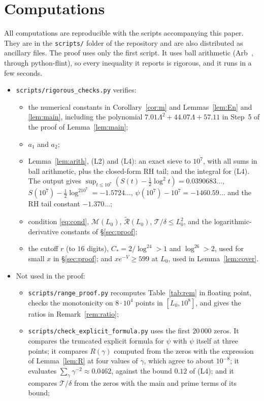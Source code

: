 \documentclass[11pt]{amsart}
\theoremstyle{remark}
\begin{document}
\appendix
\section{Computations}\label{app:comp}
All computations are reproducible with the scripts accompanying this paper. They are in the \texttt{scripts/} folder of the repository and are also distributed as ancillary files. The proof uses only the first script. It uses ball arithmetic (Arb~\cite{Arb}, through python-flint), so every inequality it reports is rigorous, and it runs in a few seconds.
\begin{itemize}
\item \texttt{scripts/rigorous\_checks.py} verifies:
\begin{itemize}
\item[--] the numerical constants in Corollary~\ref{cor:m} and Lemmas~\ref{lem:En} and \ref{lem:main}, including the polynomial $7.01\Lambda^2+44.07\Lambda+57.11$ in Step~5 of the proof of Lemma~\ref{lem:main};
\item[--] $a_1$ and $a_2$;
\item[--] Lemma~\ref{lem:arith}, (L2) and (L4): an exact sieve to $10^7$, with all sums in ball arithmetic, plus the closed-form RH tail; and the integral for (L4). The output gives $\sup_{t\le10^7}(S(t)-\frac12\log^2t)=0.0390683\ldots$, $S(10^7)-\frac12\log^210^7=-1.5724\ldots$, $\psi(10^7)-10^7=-1460.59\ldots$ and the RH tail constant $-1.370\ldots$;
\item[--] condition \eqref{eq:cond}, $\mathcal M(L_0)$, $\widetilde{\mathcal R}(L_0)$, $\mathcal T/\delta\le L_0^2$, and the logarithmic-derivative constants of \S\ref{sec:proof};
\item[--] the cutoff $r$ (to $16$ digits), $C_*=2/\log^24>1$ and $\log^26>2$, used for small $x$ in \S\ref{sec:proof}; and $xe^{-V}\ge599$ at $L_0$, used in Lemma~\ref{lem:cover}.
\end{itemize}
\item Not used in the proof:
\begin{itemize}
\item[--] \texttt{scripts/range\_proof.py} recomputes Table~\ref{tab:rem} in floating point, checks the monotonicity on $8\cdot10^4$ points in $[L_0,10^8]$, and gives the ratios in Remark~\ref{rem:ratio};
\item[--] \texttt{scripts/check\_explicit\_formula.py} uses the first $20\,000$ zeros. It compares the truncated explicit formula for $\psi$ with $\psi$ itself at three points; it compares $R(\gamma)$ computed from the zeros with the expression of Lemma~\ref{lem:R} at four values of $\gamma$, which agree to about $10^{-8}$; it evaluates $\sum_\gamma\gamma^{-2}\approx0.0462$, against the bound $0.12$ of (L4); and it compares $\mathcal T/\delta$ from the zeros with the main and prime terms of its bound;

\end{itemize}
\end{itemize}
\end{document}
